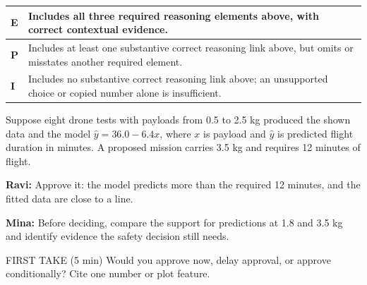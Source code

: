 \documentclass[11pt]{article}
\begin{document}
{\small\renewcommand{\arraystretch}{1.25}
\noindent\begin{tabular}{|p{0.5in}|p{5.9in}|}
\hline
\textbf{E} & Includes all three required reasoning elements above, with correct contextual evidence. \\ \hline
\textbf{P} & Includes at least one substantive correct reasoning link above, but omits or misstates another required element. \\ \hline
\textbf{I} & Includes no substantive correct reasoning link above; an unsupported choice or copied number alone is insufficient. \\ \hline
\end{tabular}}

\clearpage
{}

Suppose eight drone tests with payloads from 0.5 to 2.5 kg produced the shown data and the model $\hat y=36.0-6.4x$, where $x$ is payload and $\hat y$ is predicted flight duration in minutes. A proposed mission carries 3.5 kg and requires 12 minutes of flight.\par\smallskip \textbf{Ravi:} Approve it: the model predicts more than the required 12 minutes, and the fitted data are close to a line.\par \textbf{Mina:} Before deciding, compare the support for predictions at 1.8 and 3.5 kg and identify evidence the safety decision still needs.\par
\begin{center}
\end{center}
\begin{firsttakebox}{FIRST TAKE (5 min)}
Would you approve now, delay approval, or approve conditionally? Cite one number or plot feature.\par
{}
\end{firsttakebox}
\end{document}
